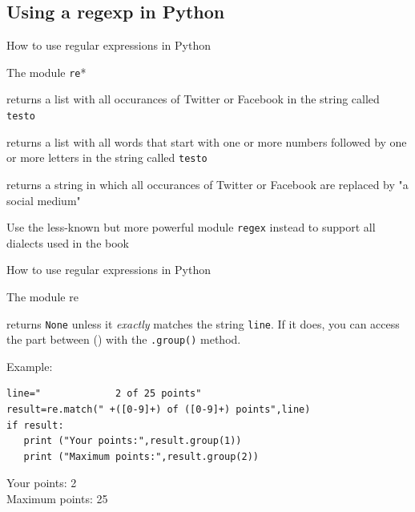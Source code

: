 \documentclass[handout]{beamer}
\begin{document}
\subsection{Using a regexp in Python}
\begin{frame}{How to use regular expressions in Python}
\begin{block}{The module \texttt{re}*}
\begin{description}
\item<1->[{\tt{re.findall("\lbrack Tt\rbrack witter|\lbrack Ff\rbrack acebook",testo)}}] returns a list with all occurances of Twitter or Facebook in the string called {\tt{testo}}
\item<1->[{\tt{re.findall("\lbrack 0-9\rbrack +\lbrack a-zA-Z\rbrack +",testo)}}] returns a list with all words that start with one or more numbers followed by one or more letters in the string called {\tt{testo}}
\item<2->[{\tt{re.sub("\lbrack Tt\rbrack witter|\lbrack Ff\rbrack acebook","a social medium",testo)}}] returns a string in which all occurances of Twitter or Facebook are replaced by "a social medium"
\end{description}
\end{block}

\tiny{Use the less-known but more powerful module \texttt{regex} instead to support all dialects used in the book}
\end{frame}


\begin{frame}[fragile]{How to use regular expressions in Python}
\begin{block}{The module re}
\begin{description}
\item<1->[{\tt{re.match(" +(\lbrack 0-9\rbrack +) of (\lbrack 0-9\rbrack +) points",line)}}] returns  \texttt{None} unless it \emph{exactly} matches the string \texttt{line}. If it does, you can access the part between () with the \texttt{.group()} method.
\end{description}
\end{block}

Example:
\begin{lstlisting}
line="             2 of 25 points"
result=re.match(" +([0-9]+) of ([0-9]+) points",line)
if result:
   print ("Your points:",result.group(1))
   print ("Maximum points:",result.group(2))
\end{lstlisting}
Your points: 2\\
Maximum points: 25
\end{frame}
\end{document}
